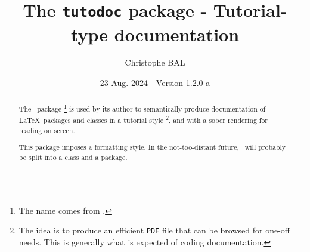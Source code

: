 \title{The \texttt{tutodoc} package - Tutorial-type documentation}
\author{Christophe BAL}
\date{23 Aug. 2024 - Version 1.2.0-a}

\maketitle

\begin{abstract}
The \thispack\ package
\footnote{
    The name comes from .
}
is used by its author to semantically produce documentation of \LaTeX\ packages and classes in a tutorial style
\footnote{
    The idea is to produce an efficient \texttt{PDF} file that can be browsed for one-off needs. This is generally what is expected of coding documentation.
},
and with a sober rendering for reading on screen.


\begin{tdocnote}
    This package imposes a formatting style. In the not-too-distant future, \thispack\ will probably be split into a class and a package.
\end{tdocnote}
\end{abstract}

